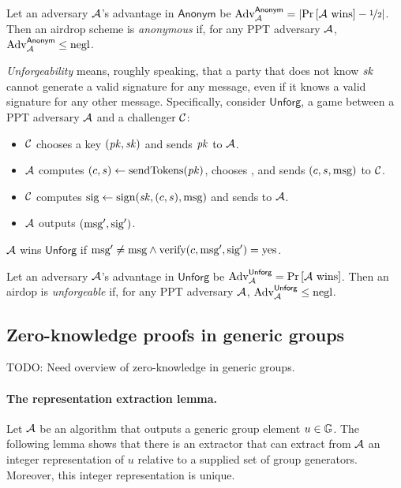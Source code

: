 \begin{definition}
Let an adversary $\mathcal{A}$'s advantage in $\mathsf{Anonym}$ be
$\mathrm{Adv}_{\mathcal{A}}^{\mathsf{Anonym}} = \left|{\operatorname*{Pr}\left[{\mathcal{A}~\text{wins}}\right] - \nicefrac{1}{2}}\right|$.
Then an airdrop scheme is \emph{anonymous} if, for any PPT adversary
    $\mathcal{A}$, $\mathrm{Adv}_{\mathcal{A}}^{\mathsf{Anonym}} \le \text{negl}$.
\end{definition}


\medskip\noindent\textit{Unforgeability} means, roughly speaking, that
    a party that does not know $\mathit{sk}$ cannot generate a valid signature
    for any message, even if it knows a valid signature for any other
    message.
Specifically, consider $\mathsf{Unforg}$, a game between a PPT adversary
    $\mathcal{A}$ and a challenger $\mathcal{C}$:
%
\begin{itemize}
\item $\mathcal{C}$ chooses a key $(\mathit{pk}, \mathit{sk})$ and sends $\mathit{pk}$ to $\mathcal{A}$.

\item $\mathcal{A}$ computes $(c, s) \gets \text{sendTokens}(\mathit{pk})$, chooses \msg, and sends $(c, s, \text{msg})$ to $\mathcal{C}$.

\item $\mathcal{C}$ computes $\text{sig} \gets \text{sign}(\mathit{sk}, (c, s), \text{msg})$ and sends to $\mathcal{A}$.

\item $\mathcal{A}$ outputs $(\text{msg}', \text{sig}')$.

\end{itemize}
%
$\mathcal{A}$ wins $\mathsf{Unforg}$ if $\text{msg}' \neq \text{msg} \wedge \text{verify}(c, \text{msg}', \text{sig}') = \text{yes}$.

\begin{definition}
Let an adversary $\mathcal{A}$'s advantage in $\mathsf{Unforg}$ be
$\mathrm{Adv}_{\mathcal{A}}^{\mathsf{Unforg}} = \operatorname*{Pr}\left[{\mathcal{A}~\text{wins}}\right]$.
Then an airdop is \emph{unforgeable} if, for any PPT adversary $\mathcal{A}$,
$\mathrm{Adv}_{\mathcal{A}}^{\mathsf{Unforg}} \le \text{negl}$.
\end{definition}


\subsection{Zero-knowledge proofs in generic groups}

TODO: Need overview of zero-knowledge in generic groups. 

\paragraph{The representation extraction lemma.}
Let $\mathcal{A}$ be an algorithm that outputs 
a generic group element $u \in \mathbb G$.
The following lemma shows that there is an extractor that
can extract from $\mathcal{A}$ an integer representation of $u$
relative to a supplied set of group generators.
Moreover, this integer representation is unique.

